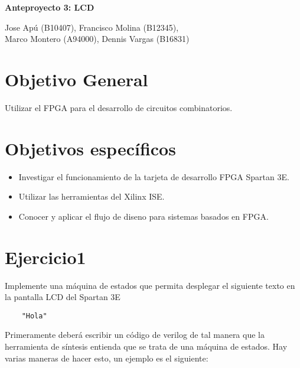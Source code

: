 \documentclass[10pt]{article}
\begin{document}
\begin{huge}
\begin{center}
\textbf{Anteproyecto 3:  LCD}
\end{center}
\end{huge}

\begin{Large}
\begin{center}
Jose Apú (B10407), Francisco Molina (B12345), \\Marco Montero (A94000), Dennis Vargas (B16831)
\end{center}
\end{Large}


\section*{Objetivo General}
Utilizar el FPGA para el desarrollo de circuitos combinatorios.

\section*{Objetivos específicos}
\begin{itemize}
\item Investigar el funcionamiento de la tarjeta de desarrollo FPGA Spartan 3E.
\item Utilizar las herramientas del Xilinx ISE.
\item Conocer y aplicar el flujo de diseno para sistemas basados en FPGA.
\end{itemize}

\newpage

\section*{Ejercicio1}
Implemente una máquina de estados que permita desplegar el siguiente texto en la pantalla LCD del Spartan 3E
\begin{lstlisting}
	"Hola"
\end{lstlisting}
Primeramente deberá escribir un código de verilog de tal manera que la herramienta de síntesis entienda que se trata de una máquina de estados. Hay varias maneras de hacer esto, un ejemplo es el siguiente:
\end{document}
